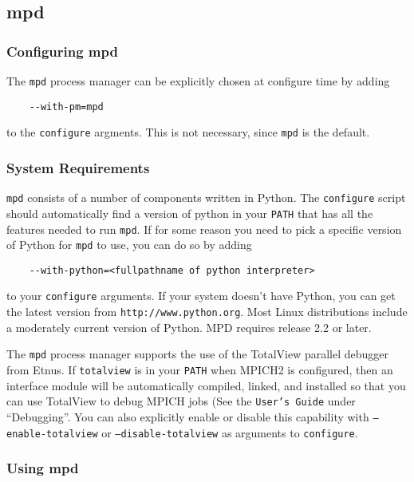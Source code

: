 \documentclass[dvipdfm,11pt]{article}
\begin{document}
\subsection{mpd}
\label{sec:mpd}

\subsubsection{Configuring mpd}
\label{sec:configuring-mpd}

The \texttt{mpd} process manager can be explicitly chosen at configure
time by adding
\begin{verbatim}
    --with-pm=mpd
\end{verbatim}
to the \texttt{configure} argments.  This is not necessary, since
\texttt{mpd} is the default.


\subsubsection{System Requirements}
\label{sec:mpd-requirements}

\texttt{mpd} consists of a number of components written in Python.
The \texttt{configure} script should automatically find a version of
python in your \texttt{PATH} that has all the features needed to run
\texttt{mpd}.  If for some reason you need to pick a specific version of
Python for \texttt{mpd} to use, you can do so by adding
\begin{verbatim}
    --with-python=<fullpathname of python interpreter>
\end{verbatim}
to your \texttt{configure} arguments.  If your system doesn't have Python,
you can get the latest version from \texttt{http://www.python.org}.
Most Linux distributions include a moderately current version of Python.
MPD requires release 2.2 or later.

The \texttt{mpd} process manager supports the use of the TotalView
parallel debugger from Etnus.  If \texttt{totalview} is in your
\texttt{PATH} when MPICH2 is configured, then an interface module will
be automatically compiled, linked, and installed so that you can use
TotalView to debug MPICH jobs (See the \texttt{User's Guide} under
``Debugging''.  You can also explicitly enable or disable this
capability with \texttt{--enable-totalview} or
\texttt{--disable-totalview} as arguments to \texttt{configure}.

\subsubsection{Using mpd}
\label{sec:using-mpd}
\end{document}

